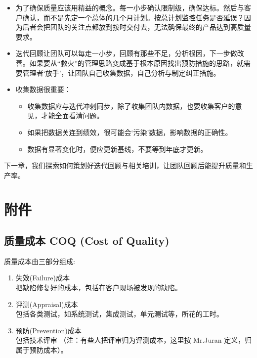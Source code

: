 \begin{itemize}
\tightlist
\item
  为了确保质量应该用精益的概念。每一小步确认限制级，确保达标。然后与客户确认，而不是先定一个总体的几个月计划。按总计划监控任务是否延误？因为后者会把团队的关注点都放到按时交付去，无法确保最终的产品达到高质量要求。
\item
  迭代回顾让团队可以每走一小步，回顾有那些不足，分析根因，下一步做改善。如果要从``救火''的管理思路变成基于根本原因找出预防措施的思路，就需要管理者`放手'，让团队自己收集数据，自己分析与制定纠正措施。
\item
  收集数据很重要：

  \begin{itemize}
  \tightlist
  \item
    收集数据应与迭代冲刺同步，除了收集团队内数据，也要收集客户的意见，才能全面看清问题。
  \item
    如果把数据关连到绩效，很可能会`污染'数据，影响数据的正确性。
  \item
    数据有显著变化时，便应更新基线，不要等到年底才更新。
  \end{itemize}
\end{itemize}

下一章，我们探索如何策划好迭代回顾与相关培训，让团队回顾后能提升质量和生产率。

\hypertarget{ux9644ux4ef6}{%
\section{附件}\label{ux9644ux4ef6}}

\hypertarget{ux8d28ux91cfux6210ux672c-coq-cost-of-quality}{%
\subsection{质量成本 COQ (Cost of
Quality)}\label{ux8d28ux91cfux6210ux672c-coq-cost-of-quality}}

质量成本由三部分组成:

\begin{enumerate}
\tightlist
\item
  失效(Failure)成本\\
  把缺陷修复好的成本，包括在客户现场被发现的缺陷。
\item
  评测(Appraisal)成本\\
  包括各类测试，如系统测试，集成测试，单元测试等，所花的工时。
\item
  预防(Prevention)成本\\
  包括技术评审 （注：有些人把评审归为评测成本，这里按 Mr.Juran
  定义，归属于预防成本）。
\end{enumerate}

